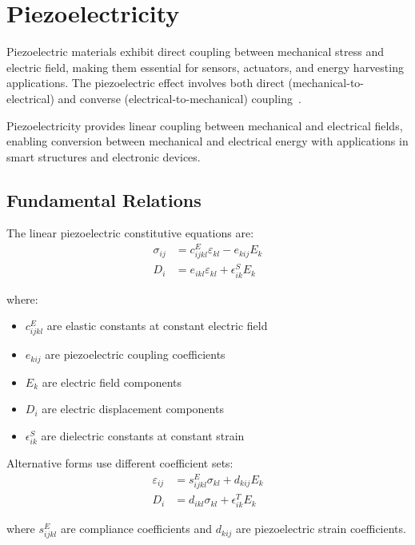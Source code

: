 \section{Piezoelectricity}

Piezoelectric materials exhibit direct coupling between mechanical stress and electric field, making them essential for sensors, actuators, and energy harvesting applications. The piezoelectric effect involves both direct (mechanical-to-electrical) and converse (electrical-to-mechanical) coupling~\autocite{Sadd.2019}.

\begin{keypoint}
Piezoelectricity provides linear coupling between mechanical and electrical fields, enabling conversion between mechanical and electrical energy with applications in smart structures and electronic devices.
\end{keypoint}

\subsection{Fundamental Relations}

The linear piezoelectric constitutive equations are:
\begin{align}
\sigma_{ij} &= c_{ijkl}^E \varepsilon_{kl} - e_{kij} E_k\\
D_i &= e_{ikl} \varepsilon_{kl} + \epsilon_{ik}^S E_k
\end{align}

where:
\begin{itemize}
\item $c_{ijkl}^E$ are elastic constants at constant electric field
\item $e_{kij}$ are piezoelectric coupling coefficients
\item $E_k$ are electric field components
\item $D_i$ are electric displacement components
\item $\epsilon_{ik}^S$ are dielectric constants at constant strain
\end{itemize}

Alternative forms use different coefficient sets:
\begin{align}
\varepsilon_{ij} &= s_{ijkl}^E \sigma_{kl} + d_{kij} E_k\\
D_i &= d_{ikl} \sigma_{kl} + \epsilon_{ik}^T E_k
\end{align}

where $s_{ijkl}^E$ are compliance coefficients and $d_{kij}$ are piezoelectric strain coefficients.

